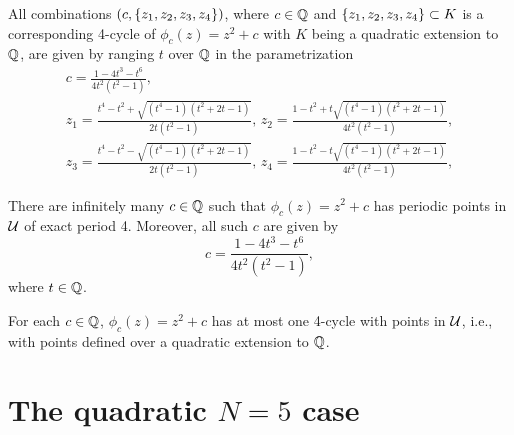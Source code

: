 \documentclass[aspectratio=1610]{beamer}
\begin{document}
\begin{frame}
  \begin{theorem} 
    \label{th:all}
    All combinations $(c, \left\{z_1, z_2, z_3, z_4\right\})$, where $c \in \mathbb{Q}$
    and $\left\{z_1, z_2, z_3, z_4\right\} \subset K$ is a corresponding
    4-cycle of $\phi_c(z) = z^2 + c$ with $K$ being a quadratic
    extension to $\mathbb{Q}$, are given by ranging $t$ over $\mathbb{Q}$ in the
    parametrization
    \begin{equation}
      \begin{gathered}
        c = \frac{1 - 4t^3 - t^6}{4t^2(t^2 - 1)}, \\
        z_1 = \frac{t^4 - t^2 + \sqrt{(t^4 - 1)(t^2 + 2t - 1)}}{2t(t^2
          - 1)},\,
        z_2 = \frac{1 - t^2 + t \sqrt{(t^4 - 1)(t^2 + 2t -
            1)}}{4t^2(t^2 - 1)}, \\
        z_3 = \frac{t^4 - t^2 - \sqrt{(t^4 - 1)(t^2 + 2t - 1)}}{2t(t^2
          - 1)},\,
        z_4 = \frac{1 - t^2 - t \sqrt{(t^4 - 1)(t^2 + 2t -
            1)}}{4t^2(t^2 - 1)},
      \end{gathered}
    \end{equation}
  \end{theorem}

  \pause

  \begin{hcorollary}
    There are infinitely many $c \in \mathbb{Q}$ such that $\phi_c(z) = z^2 +
    c$ has periodic points in $\mathcal{U}$ of exact period 4. Moreover, all
    such $c$ are given by
    \[
    \label{eq:c-param}
    c = \frac{1 - 4t^3 - t^6}{4t^2(t^2 - 1)},
    \]
    where $t \in \mathbb{Q}$.
  \end{hcorollary}

  \pause

  \begin{theorem}
    For each $c \in \mathbb{Q}$, $\phi_c(z) = z^2 + c$ has at most one 4-cycle
    with points in $\mathcal{U}$, i.e., with points defined over a quadratic
    extension to $\mathbb{Q}$.
  \end{theorem}
\end{frame}

\section{The quadratic $N = 5$ case}
\end{document}
